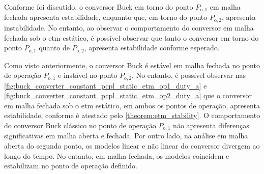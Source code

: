 Conforme foi discutido, o conversor Buck em torno do ponto $P_{\mathrm{o}, 1}$ em malha fechada apresenta estabilidade, enquanto que, em torno do ponto $P_{\mathrm{o}, 2}$, apresenta instabilidade. No entanto, ao observar o comportamento do conversor em malha fechada sob o \acrshort{etm} estático, é possível observar que tanto o conversor em torno do ponto $P_{\mathrm{o}, 1}$ quanto de $P_{\mathrm{o}, 2}$, apresenta estabilidade conforme esperado.

Como visto anteriormente, o conversor Buck é estável em malha fechada no ponto de operação  $P_{\mathrm{o}, 1}$ e instável no ponto  $P_{\mathrm{o}, 2}$. No entanto, é possível observar nas \autoref{fig:buck_converter_constant_pcpl_static_etm_op1_duty_a} e \autoref{fig:buck_converter_constant_pcpl_static_etm_op2_duty_a} que o conversor em malha fechada sob o \acrshort{etm} estático, em ambos os pontos de operação,  apresenta estabilidade, conforme é atestado pelo \autoref{theorem:etm_stability}. O comportamento do conversor Buck clássico no ponto de operação $P_{\mathrm{o}, 1}$ não apresenta diferenças significativas em malha aberta e fechada. Por outro lado, na análise em malha aberta do segundo ponto, os modelos linear e não linear do conversor divergem ao longo do tempo. No entanto, em malha fechada, os modelos coincidem e estabilizam no ponto de operação definido.


